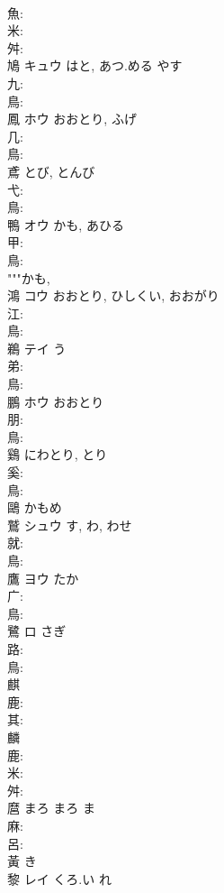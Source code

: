 \documentclass[8pt]{extreport}
\begin{document}
\begin{CJK}{UTF8}{min}
\\	魚: 
\\	米: 
\\	舛: 
\\	鳩	キュウ	はと, あつ.める	やす	
\\	九: 
\\	鳥: 
\\	鳳	ホウ		おおとり, ふげ	
\\	几: 
\\	鳥: 
\\	鳶		とび, とんび				
\\	弋: 
\\	鳥: 
\\	鴨	オウ	かも, あひる		
\\	甲: 
\\	鳥: 
\\	"""かも, 
\\	鴻	コウ	おおとり, ひしくい, おおがり		
\\	江: 
\\	鳥: 
\\	鵜	テイ	う		
\\	弟: 
\\	鳥: 
\\	鵬	ホウ	おおとり		
\\	朋: 
\\	鳥: 
\\	鷄		にわとり, とり				
\\	奚: 
\\	鳥: 
\\	鷗		かもめ				
\\	鷲	シュウ		す, わ, わせ	
\\	就: 
\\	鳥: 
\\	鷹	ヨウ	たか		
\\	广: 
\\	鳥: 
\\	鷺	ロ	さぎ		
\\	路: 
\\	鳥: 
\\	麒						
\\	鹿: 
\\	其: 
\\	麟						
\\	鹿: 
\\	米: 
\\	舛: 
\\	麿	まろ	まろ	ま	
\\	麻: 
\\	呂: 
\\	黃		き				
\\	黎	レイ	くろ.い	れ	

\end{CJK}
\end{document}
